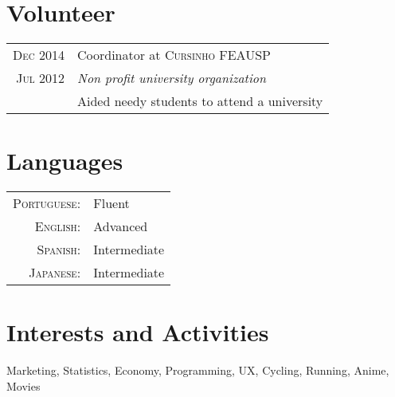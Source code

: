 \documentclass[a4paper,10pt]{article}
\begin{document}
\section{Volunteer}
\begin{tabular}{r|p{11cm}}
  \textsc{Dec} 2014 & Coordinator at \textsc{Cursinho FEAUSP} \\\textsc{Jul 2012}&\emph{Non profit university organization}\\&\footnotesize{
 Aided needy students to attend a university}

\end{tabular}

\section{Languages}
\begin{tabular}{rl}
 \textsc{Portuguese:}&Fluent\\
\textsc{English:}&Advanced\\
\textsc{Spanish:}&Intermediate\\
\textsc{Japanese:}&Intermediate\\
\end{tabular}

\section{Interests and Activities}
Marketing, Statistics, Economy, Programming, UX, Cycling, Running, Anime, Movies\\

\newpage

\end{document}
